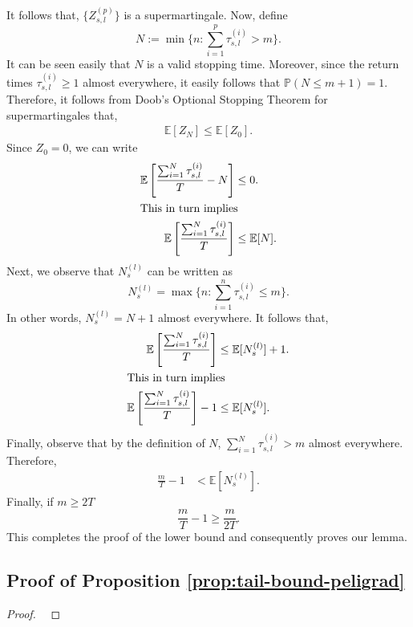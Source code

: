 \documentclass[opre,sglanonrev]{informs4}
\numberwithin{equation}{section}
\newcommand{\pow}[1]{^{(#1)}}
\newcommand{\lb}{\left[}
\newcommand{\rb}{\right]}
\newcommand{\Pbb}{\mathbb{P}}
\newcommand{\prob}{\Pbb}
\newcommand{\expec}{\mathbb{E}}
\begin{document}
\begin{APPENDICES}
It follows that, $\{Z_{s,l}\pow{p}\}$ is a supermartingale.
Now, define 
\[
N:=\min\{n:\sum_{i=1}^p\tau_{s,l}\pow{i}>m\}.
\]
It can be seen easily that $N$ is a valid stopping time. 
Moreover, since the return times $\tau_{s,l}\pow{i}\geq 1$ almost everywhere, it easily follows that $\prob(N\leq m+1)=1$.
Therefore, it follows from Doob's Optional Stopping Theorem for supermartingales \cite[Theorem 7.1, page 495]{gut2005probability} that,
\begin{align*}
    \expec[Z_N]\leq \expec[Z_0].
\end{align*}
Since $Z_0=0$, we can write  
\begin{align*}
    \expec\lb\frac{\sum_{i=1}^N\tau_{s,l}\pow{i}}{T}-N\rb& \leq 0.\\
         \intertext{This in turn implies}
    \expec\lb\frac{\sum_{i=1}^N\tau_{s,l}\pow{i}}{T}\rb & \leq \expec[N].
\end{align*}
Next, we observe that $N_s\pow{l}$ can be written as 
\[
N_s\pow{l}=\max\{n:\sum_{i=1}^n\tau_{s,l}\pow{i}\leq m\}.
\]
In other words, $N_s\pow{l}=N+1$ almost everywhere. 
It follows that,
\begin{align*}
     \expec\lb\frac{\sum_{i=1}^N\tau_{s,l}\pow{i}}{T}\rb & \leq \expec[N_s\pow{l}]+1.\\ 
     \intertext{This in turn implies}
      \expec\lb\frac{\sum_{i=1}^N\tau_{s,l}\pow{i}}{T}\rb-1&\leq \expec[N_s\pow{l}].
\end{align*}
Finally, observe that by the definition of $N$, $\sum_{i=1}^N\tau_{s,l}\pow{i}> m$ almost everywhere.
Therefore,
\begin{align*}
    \frac{m}{T}-1&< \expec[N_s\pow{l}].
\end{align*}
Finally, if $m\geq 2T$
\[
\frac{m}{T}-1\geq \frac{m}{2T}.
\]
This completes the proof of the lower bound and consequently proves our lemma.
\subsection{Proof of Proposition \ref{prop:tail-bound-peligrad}}
\begin{proof} \


\end{proof}
\end{APPENDICES}
\end{document}
